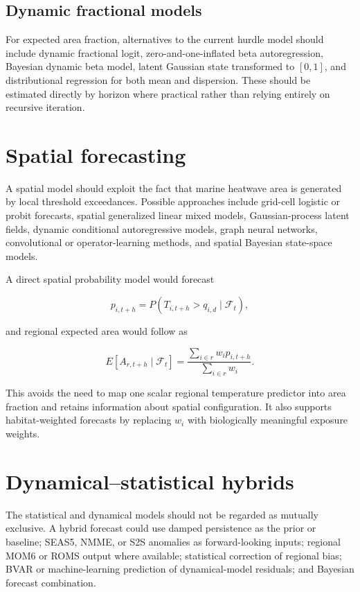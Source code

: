 \documentclass[11pt]{article}
\newcommand{\MHW}{marine heatwave}
\begin{document}
\subsection{Dynamic fractional models}

For expected area fraction, alternatives to the current hurdle model should include dynamic fractional logit, zero-and-one-inflated beta autoregression, Bayesian dynamic beta model, latent Gaussian state transformed to $[0,1]$, and distributional regression for both mean and dispersion. These should be estimated directly by horizon where practical rather than relying entirely on recursive iteration.

\section{Spatial forecasting}

A spatial model should exploit the fact that \MHW{} area is generated by local threshold exceedances. Possible approaches include grid-cell logistic or probit forecasts, spatial generalized linear mixed models, Gaussian-process latent fields, dynamic conditional autoregressive models, graph neural networks, convolutional or operator-learning methods, and spatial Bayesian state-space models.

A direct spatial probability model would forecast

\begin{equation}
p_{i,t+h}=P(T_{i,t+h}>q_{i,d}\mid \mathcal F_t),
\end{equation}

and regional expected area would follow as

\begin{equation}
E[A_{r,t+h}\mid\mathcal F_t]
=
\frac{\sum_{i\in r} w_i p_{i,t+h}}
{\sum_{i\in r}w_i}.
\end{equation}

This avoids the need to map one scalar regional temperature predictor into area fraction and retains information about spatial configuration. It also supports habitat-weighted forecasts by replacing $w_i$ with biologically meaningful exposure weights.

\section{Dynamical--statistical hybrids}

The statistical and dynamical models should not be regarded as mutually exclusive. A hybrid forecast could use damped persistence as the prior or baseline; SEAS5, NMME, or S2S anomalies as forward-looking inputs; regional MOM6 or ROMS output where available; statistical correction of regional bias; BVAR or machine-learning prediction of dynamical-model residuals; and Bayesian forecast combination.
\end{document}
